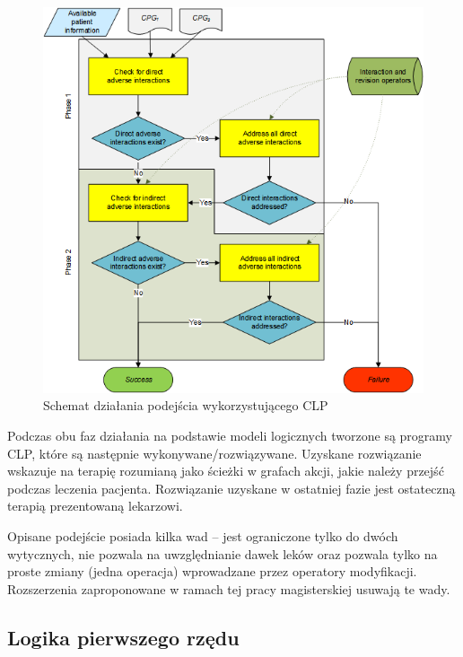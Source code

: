 \begin{figure}[H]
\begin{center}
\includegraphics[scale=0.6]{img/algorytm-clp.png}
\end{center}
\caption{Schemat działania podejścia wykorzystującego CLP \cite{SzWilk2}}
\label{fig:algorytm-clp}
\end{figure}

Podczas obu faz działania na podstawie modeli logicznych tworzone są programy CLP, które są następnie wykonywane/rozwiązywane. Uzyskane rozwiązanie wskazuje na terapię rozumianą jako ścieżki w grafach akcji, jakie należy przejść podczas leczenia pacjenta. Rozwiązanie uzyskane w ostatniej fazie jest ostateczną terapią prezentowaną lekarzowi.

Opisane podejście posiada kilka wad -- jest ograniczone tylko do dwóch wytycznych, nie pozwala na uwzględnianie dawek leków oraz pozwala tylko na proste zmiany (jedna operacja) wprowadzane przez operatory modyfikacji. Rozszerzenia zaproponowane w ramach tej pracy magisterskiej usuwają te wady.



\subsection{Logika pierwszego rzędu}

